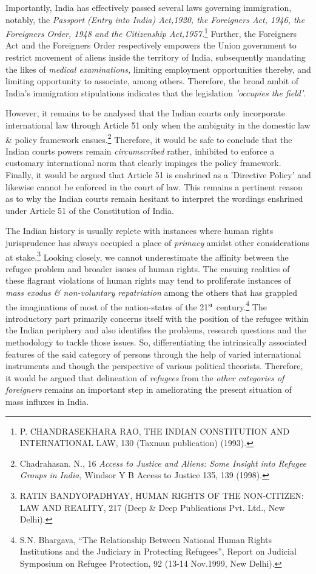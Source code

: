 \begin{multicols}{2}
\noi
Importantly, India has effectively passed several laws governing immigration, notably, the
\textit{Passport (Entry into India) Act,1920, the Foreigners Act, 1946, the Foreigners Order, 1948
and the Citizenship Act,1957.}\footnote{P. CHANDRASEKHARA RAO, THE INDIAN CONSTITUTION AND INTERNATIONAL LAW, 130 (Taxman publication) (1993).} Further, the Foreigners Act and the Foreigners Order
respectively empowers the Union government to restrict movement of aliens inside the
territory of India, subsequently mandating the likes of \textit{medical examinations,} limiting
employment opportunities thereby, and limiting opportunity to associate, among others.
Therefore, the broad ambit of India's immigration stipulations indicates that the legislation
\textit{'occupies the field'}.

\noi
However, it remains to be analysed that the Indian courts only incorporate international law
through Article 51 only when the ambiguity in the domestic law \& policy framework
ensues.\footnote{Chadrahasan. N., 16 \textit{Access to Justice and Aliens: Some Insight into Refugee Groups in India,} Windsor Y B Access to Justice 135, 139 (1998).} Therefore, it would be safe to conclude that the Indian courts powers remain \textit{circumscribed} rather, inhibited to enforce a customary international norm that clearly
impinges the policy framework. Finally, it would be argued that Article 51 is enshrined as a
'Directive Policy' and likewise cannot be enforced in the court of law. This remains a
pertinent reason as to why the Indian courts remain hesitant to interpret the wordings
enshrined under Article 51 of the Constitution of India.


\noi
The Indian history is usually replete with instances where human rights jurisprudence has
always occupied a place of \textit{primacy} amidst other considerations at stake.\footnote{RATIN BANDYOPADHYAY, HUMAN RIGHTS OF THE NON-CITIZEN: LAW AND REALITY, 217 (Deep \& Deep Publications Pvt. Ltd., New Delhi).} Looking closely, we cannot underestimate the affinity between the refugee problem and broader issues of human rights. The ensuing realities of these flagrant violations of human rights may tend to
proliferate instances of \textit{mass exodus \& non-voluntary repatriation} among the others that has
grappled the imaginations of most of the nation-states of the 21$^{\rm st}$ century.\footnote{S.N. Bhargava, “The Relationship Between National Human Rights Institutions and the Judiciary in Protecting Refugees”, Report on Judicial Symposium on Refugee Protection, 92 (13-14 Nov.1999, New Delhi).} The introductory
part primarily concerns itself with the position of the refugee within the Indian periphery and
also identifies the problems, research questions and the methodology to tackle those issues.
So, differentiating the intrinsically associated features of the said category of persons through
the help of varied international instruments and though the perspective of various political
theorists. Therefore, it would be argued that delineation of \textit{refugees} from the \textit{other categories
of foreigners} remains an important step in ameliorating the present situation of mass influxes
in India.


\end{multicols}
